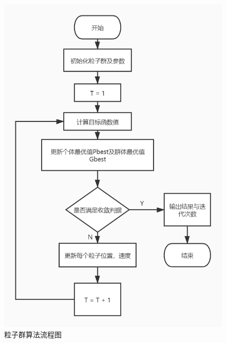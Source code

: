 \begin{figure}[H]
    \centering
    \includegraphics[width=13cm]{figure/PSO.jpg}%
    \caption{粒子群算法流程图}
    \label{fig-pso}
\end{figure}
